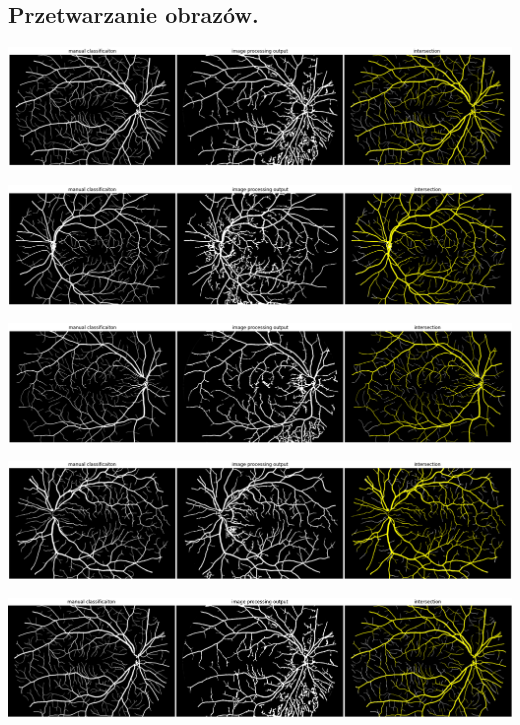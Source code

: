 \documentclass[a4paper, 11pt]{article}
\begin{document}
\subsection{Przetwarzanie obrazów.}
\begin{center}
	\includegraphics[width=\textwidth]{./processing/01_h.png}
	
	\includegraphics[width=\textwidth]{./processing/04_h.png}
	
	\includegraphics[width=\textwidth]{./processing/09_h.png}
	
	\includegraphics[width=\textwidth]{./processing/12_h.png}
	
	\includegraphics[width=\textwidth]{./processing/15_h.png}
	
\end{center}


\newpage
\end{document}
